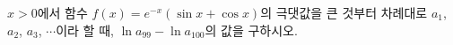 $x>0$에서 함수 $f(x)=e^{-x}(\sin x+\cos x)$의 극댓값을 큰 것부터 차례대로 $a_1$, $a_2$, $a_3$, $\cdots$이라 할 때, $\ln a_{99}-\ln a_{100}$의 값을 구하시오.
